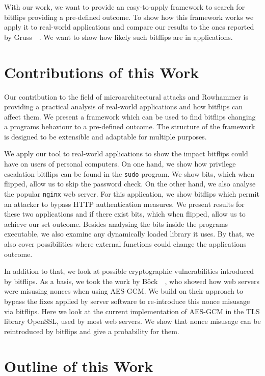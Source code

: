 With our work, we want to provide an easy-to-apply framework to search for
bitflips providing a pre-defined outcome. To show how this framework works we
apply it to real-world applications and compare our results to the ones reported
by Gruss~\etal~\cite{flipinthewall}. We want to show how likely such bitflips
are in applications.

\section{Contributions of this Work}

Our contribution to the field of microarchitectural attacks and Rowhammer is
providing a practical analysis of real-world applications and how bitflips can
affect them. We present a framework which can be used to find bitflips changing
a program\textquotesingle s behaviour to a pre-defined outcome. The structure of
the framework is designed to be extensible and adaptable for multiple purposes.

We apply our tool to real-world applications to show the impact bitflips could
have on users of personal computers. On one hand, we show how privilege
escalation bitflips can be found in the \texttt{sudo} program. We show bits,
which when flipped, allow us to skip the password check. On the other hand, we
also analyse the popular \texttt{nginx} web server. For this application, we
show bitflips which permit an attacker to bypass HTTP authentication measures.
We present results for these two applications and if there exist bits, which
when flipped, allow us to achieve our set outcome. Besides analysing the bits
inside the program\textquotesingle s executable, we also examine any dynamically
loaded library it uses. By that, we also cover possibilities where external
functions could change the application\textquotesingle s outcome.

In addition to that, we look at possible cryptographic vulnerabilities
introduced by bitflips. As a basis, we took the work by
Böck~\etal~\cite{gcmnonceattack}, who showed how web servers were misusing
nonces when using AES-GCM. We build on their approach to bypass the fixes
applied by server software to re-introduce this nonce misusage via bitflips.
Here we look at the current implementation of AES-GCM in the TLS library
OpenSSL, used by most web servers. We show that nonce misusage can be
reintroduced by bitflips and give a probability for them.

\section{Outline of this Work}

